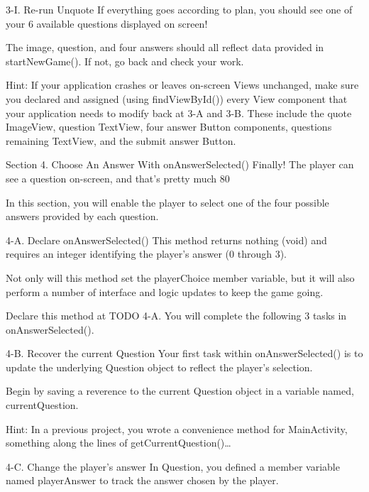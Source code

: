         3-I. Re-run Unquote
                If everything goes according to plan, you should see one of your 6 available questions displayed on screen!

                The image, question, and four answers should all reflect data provided in startNewGame(). If not, go back and check your work.

                        Hint: If your application crashes or leaves on-screen Views unchanged, make sure you declared and assigned (using findViewById()) every View component that your application needs to modify back at 3-A and 3-B.
                        These include the quote ImageView, question TextView, four answer Button components, questions remaining TextView, and the submit answer Button.

Section 4. Choose An Answer With onAnswerSelected()
                Finally! The player can see a question on-screen, and that’s pretty much 80%

                In this section, you will enable the player to select one of the four possible answers provided by each question.

        4-A. Declare onAnswerSelected()
                This method returns nothing (void) and requires an integer identifying the player’s answer (0 through 3).

                Not only will this method set the playerChoice member variable, but it will also perform a number of interface and logic updates to keep the game going.

                Declare this method at TODO 4-A. You will complete the following 3 tasks in onAnswerSelected().

        4-B. Recover the current Question
                Your first task within onAnswerSelected() is to update the underlying Question object to reflect the player’s selection.

                Begin by saving a reverence to the current Question object in a variable named, currentQuestion.

                        Hint: In a previous project, you wrote a convenience method for MainActivity, something along the lines of getCurrentQuestion()…

        4-C. Change the player’s answer
                In Question, you defined a member variable named playerAnswer to track the answer chosen by the player.

